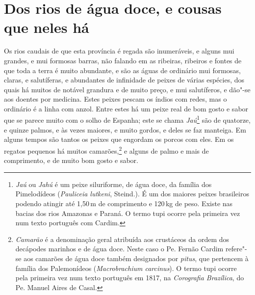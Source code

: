 \section{Dos rios de água doce, e cousas que neles há}
 Os rios caudais de que esta província é regada são inumeráveis, e
alguns mui grandes, e mui formosas barras, não falando em as ribeiras,
ribeiros e fontes de que toda a terra é muito abundante, e são as águas
de ordinário mui formosas, claras, e salutíferas, e abundantes de
infinidade de peixes de várias espécies, dos quais há muitos de notável
grandura e de muito preço, e mui salutíferos, e dão"-se aos doentes por
medicina. Estes peixes pescam os índios com redes, mas o ordinário é a
linha com anzol. Entre estes há um peixe real de bom gosto e sabor que
se parece muito com o solho de Espanha; este se chama 
\textit{Jaú}\footnote{ \textit{Jaú} ou \textit{Jahú} é um peixe siluriforme,
de água doce, da família dos Pimelodídeos (\textit{Pauliceia lutkeni}, Steind.). 
É um dos maiores peixes brasileiros podendo atingir até
1,50\,m de comprimento e 120\,kg de peso. Existe nas bacias dos rios
Amazonas e Paraná. O termo tupi ocorre pela primeira vez num texto
português com Cardim.} são de quatorze, e quinze palmos, e às vezes
maiores, e muito gordos, e deles se faz manteiga. Em alguns tempos são
tantos os peixes que engordam os porcos com eles. Em os regatos
pequenos há muitos camarões,\footnote{ \textit{Camarão} é a
denominação geral atribuída aos crustáceos da ordem dos decápodes
marinhos e de água doce. Neste caso o Pe. Fernão Cardim refere"-se aos
camarões de água doce também designados por \textit{pitus}, que
pertencem à família dos Palemonídeos (\textit{Macrobrachium carcinus}). 
O termo tupi ocorre pela primeira vez num texto português em 1817, na
\textit{Corografia Brazílica}, do Pe. Manuel Aires de Casal.} e alguns
de palmo e mais de comprimento, e de muito bom gosto e sabor.

